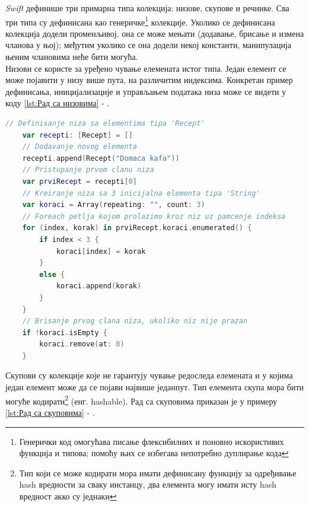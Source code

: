 \documentclass[12pt,oneside]{memoir}
\begin{document}
\indent \textit{Swift} дефинише три примарна типа колекција: низове, скупове и речнике. Сва три типа су дефинисана као генеричке\footnote{Генерички код омогућава писање флексибилних и поновно искористивих функција и типова; помоћу њих се избегава непотребно дуплирање кода} колекције. Уколико се дефинисана колекција додели променљивој, она се може мењати (додавање, брисање и измена чланова у њој); међутим уколико се она додели некој константи, манипулација њеним члановима неће бити могућа. \\
\indent Низови се користе за уређено чување елемената истог типа. Један елемент се може појавити у низу више пута, на различитим индексима. Конкретан пример дефинисања, иницијализације и управљањем података низа може се видети у коду \ref{lst:Рад са низовима} - .

\begin{lstlisting}[caption=\textit{{Рад са низовима}}, label={lst:Рад са низовима}, language=Swift, frame=single]
    // Definisanje niza sa elementima tipa 'Recept'
    var recepti: [Recept] = []
    // Dodavanje novog elementa
    recepti.append(Recept("Domaca kafa"))
    // Pristupanje prvom clanu niza
    var prviRecept = recepti[0]
    // Kreiranje niza sa 3 inicijalna elementa tipa 'String'
    var koraci = Array(repeating: "", count: 3)
    // Foreach petlja kojom prolazimo kroz niz uz pamcenje indeksa
    for (index, korak) in prviRecept.koraci.enumerated() {
        if index < 3 {
            koraci[index] = korak
        }
        else {
            koraci.append(korak)
        }
    }
    // Brisanje prvog clana niza, ukoliko niz nije prazan
    if !koraci.isEmpty {
        koraci.remove(at: 0)
    }
\end{lstlisting}

\indent Скупови су колекције које не гарантују чување редоследа елемената и у којима један елемент може да се појави највише једанпут. Тип елемента скупа мора бити могуће кодирати\footnote{Тип који се може кодирати мора имати дефинисану функцију за одређивање hash вредности за сваку инстанцу, два елемента могу имати исту hash вредност акко су једнаки} (енг. hashable). Рад са скуповима приказан је у примеру \ref{lst:Рад са скуповима} - .
\end{document}
